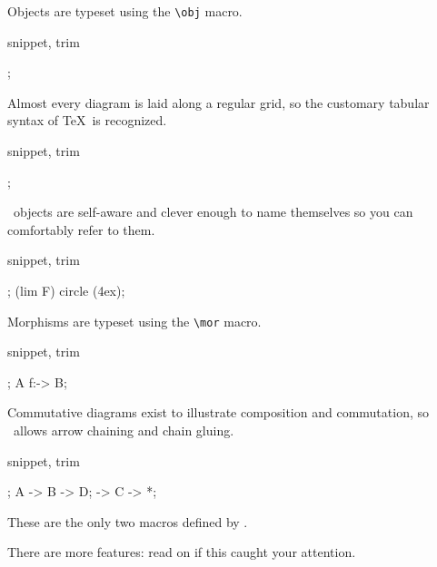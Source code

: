 Objects are typeset using the \lstinline|\obj| macro.

\begin{tcblisting}{snippet, trim}
\begin{kodi}
;
\end{kodi}
\end{tcblisting}

Almost every diagram is laid along a regular grid,
so the customary tabular syntax of \TeX\ is recognized.

\begin{tcblisting}{snippet, trim}
\begin{kodi}
;
\end{kodi}
\end{tcblisting}

\koDi\ objects are self-aware and clever enough to name themselves
so you can comfortably refer to them.

\begin{tcblisting}{snippet, trim}
\begin{kodi}
;
\draw (lim F) circle (4ex);
\end{kodi}
\end{tcblisting}

Morphisms are typeset using the \lstinline!\mor! macro.

\begin{tcblisting}{snippet, trim}
\begin{kodi}
;
\mor A f:-> B;
\end{kodi}
\end{tcblisting}

Commutative diagrams exist to illustrate composition and commutation,
so \koDi\ allows arrow chaining and chain gluing.

\begin{tcblisting}{snippet, trim}
\begin{kodi}
;
\mor A -> B -> D;
\mor * -> C -> *;
\end{kodi}
\end{tcblisting}


These are the only two macros defined by \koDi.

There are more features: read on if this caught your attention.
